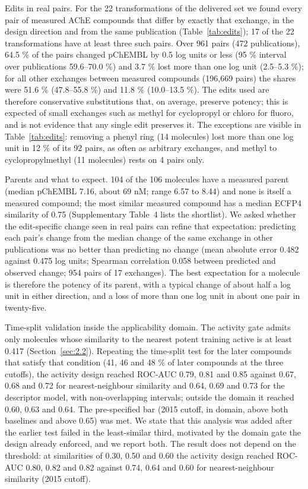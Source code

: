 \documentclass[11pt,a4paper]{article}
\begin{document}
Edits in real pairs. For the 22 transformations of the delivered set we found every pair of measured AChE compounds that differ by exactly that exchange, in the design direction and from the same publication (Table~\ref{tab:edits}); 17 of the 22 transformations have at least three such pairs. Over 961 pairs (472 publications), 64.5 \% of the pairs changed pChEMBL by 0.5 log units or less (95 \% interval over publications 59.6--70.0 \%) and 3.7 \% lost more than one log unit (2.5--5.3 \%); for all other exchanges between measured compounds (196,669 pairs) the shares were 51.6 \% (47.8--55.8 \%) and 11.8 \% (10.0--13.5 \%). The edits used are therefore conservative substitutions that, on average, preserve potency; this is expected of small exchanges such as methyl for cyclopropyl or chloro for fluoro, and is not evidence that any single edit preserves it. The exceptions are visible in Table~\ref{tab:edits}: removing a phenyl ring (14 molecules) lost more than one log unit in 12 \% of its 92 pairs, as often as arbitrary exchanges, and methyl to cyclopropylmethyl (11 molecules) rests on 4 pairs only.

Parents and what to expect. 104 of the 106 molecules have a measured parent (median pChEMBL 7.16, about 69 nM; range 6.57 to 8.44) and none is itself a measured compound; the most similar measured compound has a median ECFP4 similarity of 0.75 (Supplementary Table~4 lists the shortlist). We asked whether the edit-specific change seen in real pairs can refine that expectation: predicting each pair's change from the median change of the same exchange in other publications was no better than predicting no change (mean absolute error 0.482 against 0.475 log units; Spearman correlation 0.058 between predicted and observed change; 954 pairs of 17 exchanges). The best expectation for a molecule is therefore the potency of its parent, with a typical change of about half a log unit in either direction, and a loss of more than one log unit in about one pair in twenty-five.

Time-split validation inside the applicability domain. The activity gate admits only molecules whose similarity to the nearest potent training active is at least 0.417 (Section~\ref{sec:2.2}). Repeating the time-split test for the later compounds that satisfy that condition (41, 46 and 48 \% of later compounds at the three cutoffs), the activity design reached ROC-AUC 0.79, 0.81 and 0.85 against 0.67, 0.68 and 0.72 for nearest-neighbour similarity and 0.64, 0.69 and 0.73 for the descriptor model, with non-overlapping intervals; outside the domain it reached 0.60, 0.63 and 0.64. The pre-specified bar (2015 cutoff, in domain, above both baselines and above 0.65) was met. We state that this analysis was added after the earlier test failed in the least-similar third, motivated by the domain gate the design already enforced, and we report both. The result does not depend on the threshold: at similarities of 0.30, 0.50 and 0.60 the activity design reached ROC-AUC 0.80, 0.82 and 0.82 against 0.74, 0.64 and 0.60 for nearest-neighbour similarity (2015 cutoff).
\end{document}
